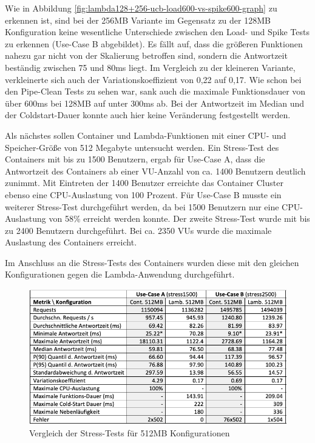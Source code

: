 Wie in Abbildung \ref{fig:lambda128+256-ucb-load600-vs-spike600-graph} zu erkennen ist, sind bei der 256MB Variante im Gegensatz zu der 128MB Konfiguration keine wesentliche Unterschiede zwischen den Load- und Spike Tests zu erkennen (Use-Case B abgebildet). Es fällt auf, dass die größeren Funktionen nahezu gar nicht von der Skalierung betroffen sind, sondern die Antwortzeit beständig zwischen 75 und 80ms liegt. Im Vergleich zu der kleineren Variante, verkleinerte sich auch der Variationskoeffizient von 0,22 auf 0,17. Wie schon bei den Pipe-Clean Tests zu sehen war, sank auch die maximale Funktionsdauer von über 600ms bei 128MB auf unter 300ms ab. Bei der Antwortzeit im Median und der Coldstart-Dauer konnte auch hier keine Veränderung festgestellt werden.


Als nächstes sollen Container und Lambda-Funktionen mit einer CPU- und Speicher-Größe von 512 Megabyte untersucht werden. Ein Stress-Test des Containers mit bis zu 1500 Benutzern, ergab für Use-Case A, dass die Antwortzeit des Containers ab einer VU-Anzahl von ca. 1400 Benutzern deutlich zunimmt. Mit Eintreten der 1400 Benutzer erreichte das Container Cluster ebenso eine CPU-Auslastung von 100 Prozent. Für Use-Case B musste ein weiterer Stress-Test durchgeführt werden, da bei 1500 Benutzern nur eine CPU-Auslastung von 58\% erreicht werden konnte. Der zweite Stress-Test wurde mit bis zu 2400 Benutzern durchgeführt. Bei ca. 2350 VUs wurde die maximale Auslastung des Containers erreicht.

Im Anschluss an die Stress-Tests des Containers wurden diese mit den gleichen Konfigurationen gegen die Lambda-Anwendung durchgeführt.

\begin{figure}[H]
    \includegraphics[width=\textwidth]{img/512MB-stress-comparison.png}
    \caption[Vergleich der Stress-Tests für 512MB Konfigurationen]{Vergleich der Stress-Tests für 512MB Konfigurationen}
    \label{fig:512MB-stress-comparison}
\end{figure}

